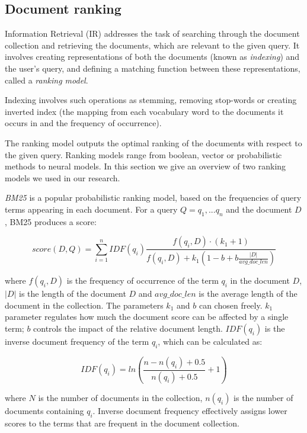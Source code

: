 \subsection{Document ranking}
\label{back_ir}

Information Retrieval (IR) addresses the task of searching through the document collection and retrieving the documents, which are relevant to the given query. It involves creating representations of both the documents (known as \textit{indexing}) and the user's query, and defining a matching function between these representations, called a \textit{ranking model}. 

Indexing involves such operations as stemming, removing stop-words or creating inverted index (the mapping from each vocabulary word to the documents it occurs in and the frequency of occurrence). 

The ranking model outputs the optimal ranking of the documents with respect to the given query. Ranking models range from boolean, vector or probabilistic methods to neural models. In this section we give an overview of two ranking models we used in our research.

\textit{BM25} \cite{robertson1995okapi} is a popular probabilistic ranking model, based on the frequencies of query terms appearing in each document. For a query $Q=q_1,... q_n$ and the document $D$, BM25 produces a score:

\begin{equation}
    score(D, Q) = \sum_{i=1}^n IDF(q_i) \frac{f(q_i,D) \cdot (k_1 + 1)}{f(q_i, D) + k_1 (1 - b + b\frac{|D|}{avg\_doc\_len})}
\end{equation}

where $f(q_i, D)$ is the frequency of occurrence of the term $q_i$ in the document $D$, $|D|$ is the length of the document $D$ and $avg\_doc\_len$ is the average length of the document in the collection. The parameters $k_1$ and $b$ can chosen freely. $k_1$ parameter regulates how much the document score can be affected by a single term; $b$ controls the impact of the relative document length. $IDF(q_i)$ is the inverse document frequency of the term $q_i$, which can be calculated as:

\begin{equation}
    IDF(q_i) = ln \left ( \frac{n - n(q_i)+0.5}{n(q_i) + 0.5} + 1 \right )
\end{equation}

where $N$ is the number of documents in the collection, $n(q_i)$ is the number of documents containing $q_i$. Inverse document frequency effectively assigns lower scores to the terms that are frequent in the document collection.

